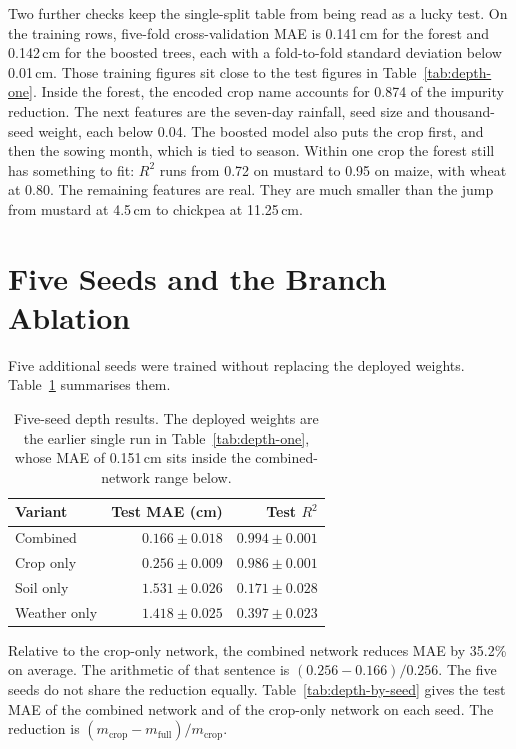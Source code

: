 Two further checks keep the single-split table from being read as a lucky test. On the training rows, five-fold cross-validation MAE is 0.141\,cm for the forest and 0.142\,cm for the boosted trees, each with a fold-to-fold standard deviation below 0.01\,cm. Those training figures sit close to the test figures in Table~\ref{tab:depth-one}. Inside the forest, the encoded crop name accounts for 0.874 of the impurity reduction. The next features are the seven-day rainfall, seed size and thousand-seed weight, each below 0.04. The boosted model also puts the crop first, and then the sowing month, which is tied to season. Within one crop the forest still has something to fit: $R^{2}$ runs from 0.72 on mustard to 0.95 on maize, with wheat at 0.80. The remaining features are real. They are much smaller than the jump from mustard at 4.5\,cm to chickpea at 11.25\,cm.

\section{Five Seeds and the Branch Ablation}
Five additional seeds were trained without replacing the deployed weights. Table~\ref{tab:depth-seeds} summarises them.

\begin{table}[H]
\centering
\caption{Five-seed depth results. The deployed weights are the earlier single run in Table~\ref{tab:depth-one}, whose MAE of 0.151\,cm sits inside the combined-network range below.}
\label{tab:depth-seeds}
\begin{tabular}{lrr}
\toprule
\textbf{Variant} & \textbf{Test MAE (cm)} & \textbf{Test $R^{2}$} \\
\midrule
Combined & $0.166 \pm 0.018$ & $0.994 \pm 0.001$ \\
Crop only & $0.256 \pm 0.009$ & $0.986 \pm 0.001$ \\
Soil only & $1.531 \pm 0.026$ & $0.171 \pm 0.028$ \\
Weather only & $1.418 \pm 0.025$ & $0.397 \pm 0.023$ \\
\bottomrule
\end{tabular}
\end{table}

Relative to the crop-only network, the combined network reduces MAE by 35.2\% on average. The arithmetic of that sentence is $(0.256 - 0.166) / 0.256$. The five seeds do not share the reduction equally. Table~\ref{tab:depth-by-seed} gives the test MAE of the combined network and of the crop-only network on each seed. The reduction is $(m_{\mathrm{crop}} - m_{\mathrm{full}}) / m_{\mathrm{crop}}$.

